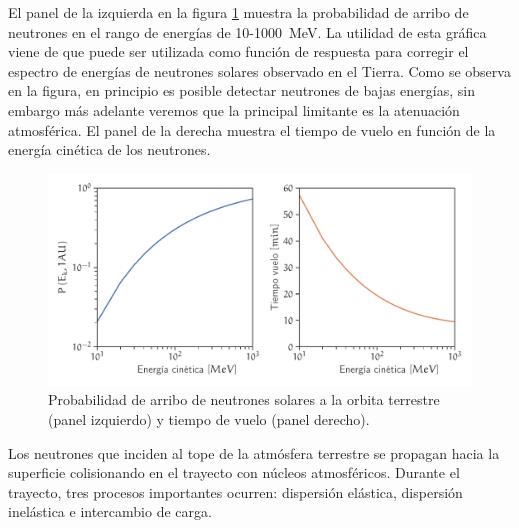 El panel de la izquierda en la figura \ref{fig:neutron-prob} muestra la probabilidad de arribo de neutrones en el rango de energías de \num{10}-\SI{1000}{\mega\electronvolt}. La utilidad de esta gráfica viene de que puede ser utilizada como función de respuesta para corregir el espectro de energías de neutrones solares observado en el Tierra. Como se observa en la figura, en principio es posible detectar neutrones de bajas energías, sin embargo más adelante veremos que la principal limitante es la atenuación atmosférica. El panel de la derecha muestra el tiempo de vuelo en función de la energía cinética de los neutrones.

\begin{figure}
        \centering
        \includegraphics[width=\textwidth]{neutron-prob.pdf}
        \caption{Probabilidad de arribo de neutrones solares a la orbita terrestre (panel izquierdo) y tiempo de vuelo (panel derecho).}
        \label{fig:neutron-prob}
\end{figure}

Los neutrones que inciden al tope de la atmósfera terrestre se propagan hacia la superficie colisionando en el trayecto con núcleos atmosféricos. Durante el trayecto, tres procesos importantes ocurren: dispersión elástica, dispersión inelástica e intercambio de carga.

